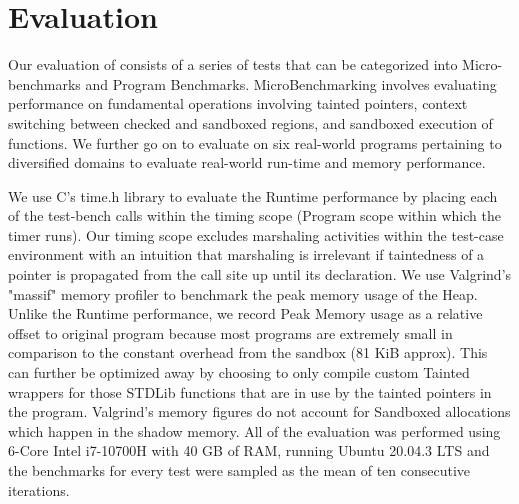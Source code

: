 \section{Evaluation}\label{sec:evaluation}

Our evaluation of \systemname consists of a series of tests that can be categorized into Micro-benchmarks and Program Benchmarks.
MicroBenchmarking involves evaluating performance on fundamental operations involving tainted pointers, context switching between checked and sandboxed regions, and sandboxed execution of functions.
We further go on to evaluate \systemname on six real-world programs pertaining to diversified domains to evaluate real-world run-time and memory performance.

We use C's \<time.h\> library to evaluate the Runtime performance by placing each of the test-bench calls within the timing scope (Program scope within which the timer runs). Our timing scope excludes marshaling activities within the test-case environment with an intuition that marshaling is irrelevant if tainted\-ness of a pointer is propagated from the call site up until its declaration. We use Valgrind's "massif" memory profiler to benchmark the peak memory usage of the Heap. Unlike the Runtime performance, we record Peak Memory usage as a relative offset to original program because most programs are extremely small in comparison to the constant overhead from the sandbox (81 KiB approx). This can further be optimized away by choosing to only compile custom Tainted wrappers for those STDLib functions that are in use by the tainted pointers in the program. Valgrind's memory figures do not account for Sandboxed allocations which happen in the shadow memory. 
All of the evaluation was performed using 6-Core Intel i7-10700H with 40 GB of RAM, running Ubuntu 20.04.3 LTS and the benchmarks for every test were sampled as the mean of ten consecutive iterations.

